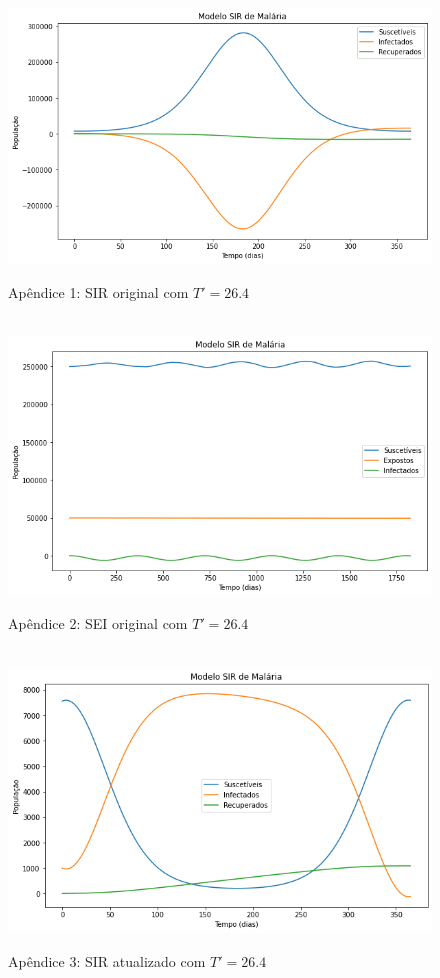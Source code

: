 \documentclass[12pt]{article}
\begin{document}
\begin{figure}[!ht]
        \centering
        \hbox{\hspace{2.0em} \includegraphics[scale=0.55] {SIR_a_incorreto.png}}
        \caption*{Apêndice 1: SIR original com $T'=26.4$}
\end{figure} 
\begin{figure}[!ht]
        \centering
        \hbox{\hspace{2.5em} \includegraphics[scale=0.55] {SEI_a_incorreto.png}}
        \caption*{Apêndice 2: SEI original com $T'=26.4$}
\end{figure} 
\newpage
\begin{figure}[!ht]
        \centering
        \hbox{\hspace{2.5em} \includegraphics[scale=0.55] {SIR_a_correto.png}}
        \caption*{Apêndice 3: SIR atualizado com $T'=26.4$}
\end{figure} 
\end{document}
